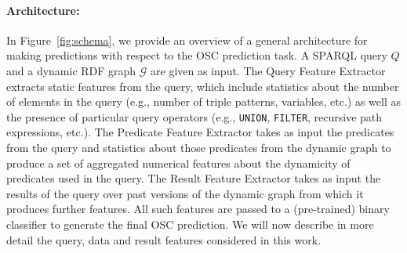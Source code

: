 \documentclass[runningheads]{llncs}
\newcommand{\ah}[1]{{\color{blue}\textsc{ah:} #1}}
\begin{document}
\paragraph{Architecture:} In Figure~\ref{fig:schema}, we provide an overview of a general architecture for making predictions with respect to the OSC prediction task. A SPARQL query $Q$ and a dynamic RDF graph $\mathcal{G}$ are given as input. The \textsf{Query Feature Extractor} extracts static features from the query, which include statistics about the number of elements in the query (e.g., number of triple patterns, variables, etc.) as well as the presence of particular query operators (e.g., \texttt{UNION}, \texttt{FILTER}, recursive path expressions, etc.). The \textsf{Predicate Feature Extractor} takes as input the predicates from the query and statistics about those predicates from the dynamic graph to produce a set of aggregated numerical features about the dynamicity of predicates used in the query. The \textsf{Result Feature Extractor} takes as input the results of the query over past versions of the dynamic graph from which it produces further features. All such features are passed to a (pre-trained) binary classifier to generate the final OSC prediction. We will now describe in more detail the query, data and result features considered in this work.

\end{document}
